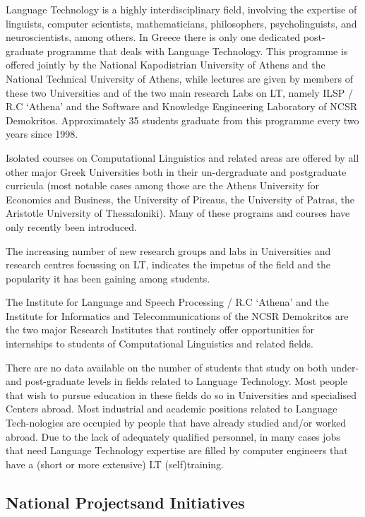 \begin{multicols}{2}
Language Technology is a highly interdisciplinary field, involving the expertise of linguists, computer scientists, mathematicians, philosophers, psycholinguists, and neuroscientists, among others. In Greece there is only one dedicated post-graduate programme that deals with Language Technology. This programme is offered jointly by the National Kapodistrian University of Athens and the National Technical University of Athens, while lectures are given by members of these two Universities and of the two main research Labs on LT, namely ILSP / R.C ‘Athena’ and the Software and Knowledge Engineering Laboratory of NCSR Demokritos. Approximately 35 students graduate from this programme every two years since 1998.

Isolated courses on Computational Linguistics and related areas are offered by all other major Greek Universities both in their un-dergraduate and postgraduate curricula (most notable cases among those are the Athens University for Economics and Business, the University of Pireaus, the University of Patras, the Aristotle University of Thessaloniki). Many of these programs and courses have only recently been introduced.

The increasing number of new research groups and labs in Universities and research centres focussing on LT, indicates the impetus of the field and the popularity it has been gaining among students.

The Institute for Language and Speech Processing / R.C ‘Athena’ and the Institute for Informatics and Telecommunications of the NCSR Demokritos are the two major Research Institutes that routinely offer opportunities for internships to students of Computational Linguistics and related fields.

There are no data available on the number of students that study on both under- and post-graduate levels in fields related to Language Technology. Most people that wish to pursue education in these fields do so in Universities and specialised Centers abroad. Most industrial and academic positions related to Language Tech-nologies are occupied by people that have already studied and/or worked abroad. Due to the lack of adequately qualified personnel, in many cases jobs that need Language Technology expertise are filled by computer engineers that have a (short or more extensive) LT (self)training.

\subsection[National Projects and Initiatives]{National Projects\newline and Initiatives}


\end{multicols}

